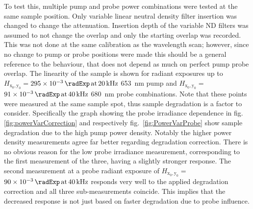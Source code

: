 \documentclass[twoside,openright,listof=numbered]{scrreprt}
\def\pumpExp#1{\ensuremath{\SI{#1}{\radExp}\,\mathrm{at}\, \SI{20}{\kilo\hertz}}}
\def\probeExp#1{\ensuremath{\SI{#1}{\radExp}\,\mathrm{at}\, \SI{40}{\kilo\hertz}}}
\def\radiantExp{\ensuremath{H_\mathrm{x_0,y_0}}}
\begin{document}
To test this, multiple pump and probe power combinations were tested at the same sample position. Only variable linear neutral density filter insertion was changed to change the attenuation. Insertion depth of the variable ND filters was assumed to not change the overlap and only the starting overlap was recorded. This was not done at the same calibration as the wavelength scan; however, since no change to pump or probe positions were made this should be a general reference to the behaviour, that does not depend as much on perfect pump probe overlap. The linearity of the sample is shown for radiant exposures up to $\radiantExp=$\pumpExp{295e-3} \SI{653}{\nano\meter} pump and $\radiantExp=$\probeExp{91e-3} \SI{680}{\nano\meter} probe combinations. Note that these points were measured at the same sample spot, thus sample degradation is a factor to consider. Specifically the graph showing the probe irradiance dependence in fig. \ref{fig:powerVarCorrection} and respectively \mbox{fig. \ref{fig:PowerVarProbe}} show sample degradation due to the high pump power density. Notably the higher power density measurements agree far better regarding degradation correction. There is no obvious reason for the low probe irradiance measurement, corresponding to the first measurement of the three, having a slightly stronger response. The second measurement at a probe radiant exposure of $\radiantExp=$\probeExp{90e-3} responds very well to the applied degradation correction and all three sub-measurements coincide. This implies that the decreased response is not just based on faster degradation due to probe influence.
\end{document}
